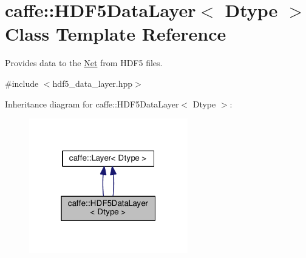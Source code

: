 \hypertarget{classcaffe_1_1_h_d_f5_data_layer}{}\section{caffe\+:\+:H\+D\+F5\+Data\+Layer$<$ Dtype $>$ Class Template Reference}
\label{classcaffe_1_1_h_d_f5_data_layer}


Provides data to the \mbox{\hyperlink{classcaffe_1_1_net}{Net}} from H\+D\+F5 files.  




{\ttfamily \#include $<$hdf5\+\_\+data\+\_\+layer.\+hpp$>$}



Inheritance diagram for caffe\+:\+:H\+D\+F5\+Data\+Layer$<$ Dtype $>$\+:
\nopagebreak
\begin{figure}[H]
\begin{center}
\leavevmode
\includegraphics[width=196pt]{classcaffe_1_1_h_d_f5_data_layer__inherit__graph}
\end{center}
\end{figure}
